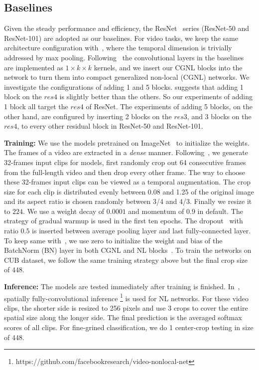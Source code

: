 \documentclass{article}
\begin{document}
\subsection{Baselines}
Given the steady performance and efficiency, the ResNet~\cite{resnet} series (ResNet-50 and ResNet-101) are adopted as our baselines.
For video tasks, we keep the same architecture configuration with~\cite{non-local}, where the temporal dimension is trivially addressed by max pooling.
Following~\cite{non-local} the convolutional layers in the baselines are implemented as $1 \times k \times k$ kernels, and we insert our CGNL blocks into the network to turn them into compact generalized non-local (CGNL) networks.
We investigate the configurations of adding 1 and 5 blocks.
\cite{non-local} suggests that adding 1 block on the $res4$ is slightly better than the others.
So our experiments of adding 1 block all target the $res4$ of ResNet.
The experiments of adding 5 blocks, on the other hand, are configured by inserting 2 blocks on the $res3$, and 3 blocks on the $res4$, to every other residual block in ResNet-50 and ResNet-101.

\textbf{Training:}
We use the models pretrained on ImageNet~\cite{imagenet} to initialize the weights.
The frames of a video are extracted in a \emph{dense} manner.
Following~\cite{non-local}, we generate 32-frames input clips for models, first randomly crop out 64 consecutive frames from the full-length video and then drop every other frame.
The way to choose these 32-frames input clips can be viewed as a temporal augmentation.
The crop size for each clip is distributed evenly between 0.08 and 1.25 of the original image and its aspect ratio is chosen randomly between 3/4 and 4/3. Finally we resize it to $224$.
We use a weight decay of $0.0001$ and momentum of $0.9$ in default. 
The strategy of gradual warmup is used in the first ten epochs.
The dropout~\cite{dropout} with ratio $0.5$ is inserted between average pooling layer and last fully-connected layer.
To keep same with~\cite{non-local}, we use zero to initialize the weight and bias of the BatchNorm (BN) layer in both CGNL and NL blocks~\cite{train_imagenet_in_1h}.
To train the networks on CUB dataset, we follow the same training strategy above but the final crop size of 448. 

\textbf{Inference:}
The models are tested immediately after training is finished.
In~\cite{non-local}, spatially fully-convolutional inference \footnote{https://github.com/facebookresearch/video-nonlocal-net} is used for NL networks.
For these video clips, the shorter side is resized to 256 pixels and use 3 crops to cover the entire spatial size along the longer side.
The final prediction is the averaged softmax scores of all clips.
For fine-grined classification, we do 1 center-crop testing in size of 448.
\end{document}
